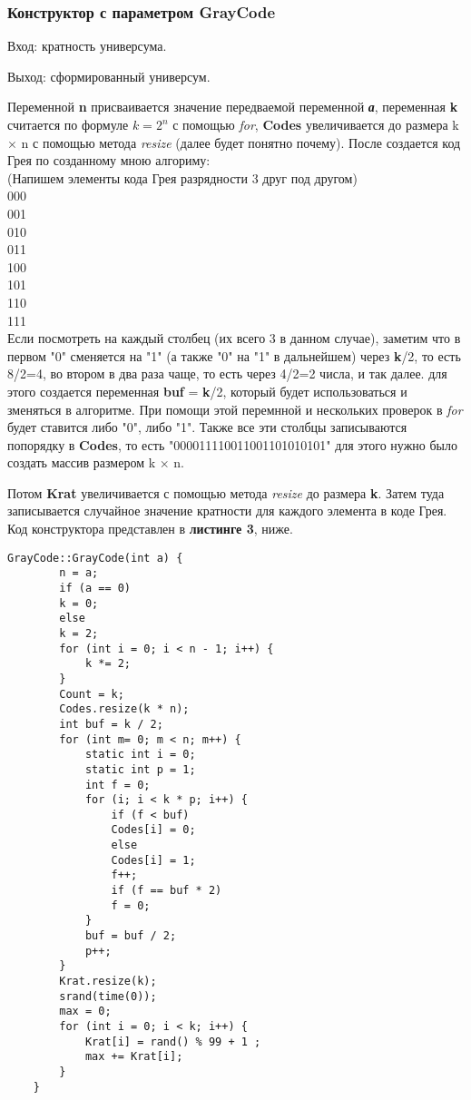 \documentclass[10pt,a4paper,final]{article} %
\begin{document}
\subsubsection {Конструктор с параметром GrayCode}
\par Вход: кратность универсума.
\par Выход: сформированный универсум.
\par Переменной \textbf{n} присваивается значение передваемой переменной \textit{\textbf{а}}, переменная \textbf{k} считается по формуле $k=2^n$ с помощью \textit{for}, \textbf{Codes} увеличивается до размера k $\times$ n с помощью метода \textit{resize} (далее будет понятно почему). После создается код Грея по созданному мною алгориму:\\
(Напишем элементы кода Грея разрядности 3 друг под другом)\\
000\\
001\\
010\\
011\\
100\\
101\\
110\\
111\\

Если посмотреть на каждый столбец (их всего 3 в данном случае), заметим что в первом "0" сменяется на "1" (а также "0" на "1" в дальнейшем) через \textbf{k}/2, то есть 8/2=4, во втором в два раза чаще, то есть через 4/2=2 числа, и так далее. для этого создается переменная \textbf{buf} = \textbf{k}/2, который будет использоваться и зменяться в алгоритме. При помощи этой перемнной и нескольких проверок в \textit{for} будет ставится либо "0", либо "1". Также все эти столбцы записываются попорядку в \textbf{Codes}, то есть "000011110011001101010101" для этого нужно было создать массив размером  k $\times$ n.
\par Потом \textbf{Krat} увеличивается с помощью метода \textit{resize} до размера \textbf{k}. Затем туда записывается случайное значение кратности для каждого элемента в коде Грея. Код конструктора представлен в \textbf{листинге 3}, ниже.
	
	

	
\begin{lstlisting}[caption={Конструктор GrayCode}]
	GrayCode::GrayCode(int a) {
		n = a;
		if (a == 0)
		k = 0;
		else
		k = 2;
		for (int i = 0; i < n - 1; i++) {
			k *= 2;
		}
		Count = k;
		Codes.resize(k * n);        
		int buf = k / 2;
		for (int m= 0; m < n; m++) {
			static int i = 0;
			static int p = 1;
			int f = 0;
			for (i; i < k * p; i++) {
				if (f < buf)
				Codes[i] = 0;
				else
				Codes[i] = 1;
				f++;
				if (f == buf * 2)
				f = 0;
			}
			buf = buf / 2;
			p++;
		} 
		Krat.resize(k);
		srand(time(0));
		max = 0;
		for (int i = 0; i < k; i++) {
			Krat[i] = rand() % 99 + 1 ;
			max += Krat[i];
		}       
	}
\end{lstlisting}
\end{document}
